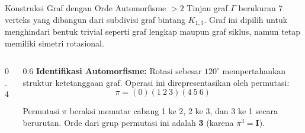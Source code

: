 \documentclass[aspectratio=169]{beamer}
\begin{document}
\begin{frame}[fragile]{Konstruksi Graf dengan Orde Automorfisme $>2$}
  Tinjau graf $\Gamma$ berukuran 7 verteks yang dibangun dari subdivisi graf bintang $K_{1,3}$. Graf ini dipilih untuk menghindari bentuk trivial seperti graf lengkap maupun graf siklus, namun tetap memiliki simetri rotasional.

  \begin{columns}
    \begin{column}{0.4\textwidth}
    \end{column}

    \begin{column}{0.6\textwidth}
      \small
      \textbf{Identifikasi Automorfisme:}
      Rotasi sebesar $120^\circ$ mempertahankan struktur ketetanggaan graf. Operasi ini direpresentasikan oleh permutasi:
      $$ \pi = (0)(1\ 2\ 3)(4\ 5\ 6) $$

      Permutasi $\pi$ beraksi memutar cabang 1 ke 2, 2 ke 3, dan 3 ke 1 secara berurutan. Orde dari grup permutasi ini adalah \textbf{3} (karena $\pi^3 = \mathbf{I}$).
    \end{column}
  \end{columns}
\end{frame}
\end{document}
